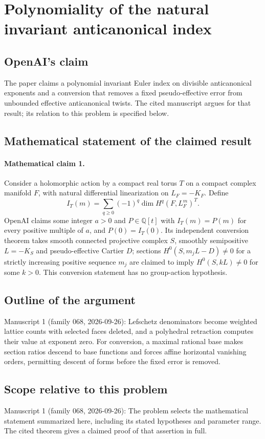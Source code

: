 \documentclass[11pt]{article}
\begin{document}
\section*{Polynomiality of the natural invariant anticanonical index}

\subsection{OpenAI's claim}
The paper claims a polynomial invariant Euler index on divisible anticanonical exponents and a conversion that removes a fixed pseudo-effective error from unbounded effective anticanonical twists. The cited manuscript argues for that result; its relation to this problem is specified below.

\subsection{Mathematical statement of the claimed result}
\paragraph{Mathematical claim 1.} Consider a holomorphic action by a compact real torus $T$ on a compact complex manifold $F$, with natural differential linearization on $L_F=-K_F$. Define
\[
I_T(m)=\sum_{q\ge0}(-1)^q\dim H^q(F,L_F^m)^T.
\]
OpenAI claims some integer $a>0$ and $P\in\mathbb Q[t]$ with $I_T(m)=P(m)$ for every positive multiple of $a$, and $P(0)=I_T(0)$.
Its independent conversion theorem takes smooth connected projective complex $S$, smoothly semipositive $L=-K_S$ and pseudo-effective Cartier $D$; sections $H^0(S,m_jL-D)\ne0$ for a strictly increasing positive sequence $m_j$ are claimed to imply $H^0(S,kL)\ne0$ for some $k>0$. This conversion statement has no group-action hypothesis.

\subsection{Outline of the argument}
Manuscript 1 (family 068, 2026-09-26): Lefschetz denominators become weighted lattice counts with selected faces deleted, and a polyhedral retraction computes their value at exponent zero. For conversion, a maximal rational base makes section ratios descend to base functions and forces affine horizontal vanishing orders, permitting descent of forms before the fixed error is removed.

\subsection{Scope relative to this problem}
Manuscript 1 (family 068, 2026-09-26): The problem selects the mathematical statement summarized here, including its stated hypotheses and parameter range. The cited theorem gives a claimed proof of that assertion in full.
\end{document}
